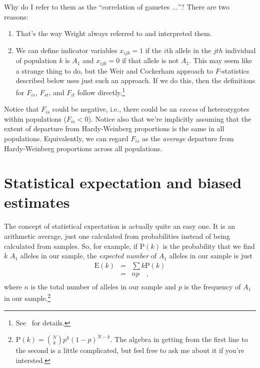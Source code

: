 Why do I refer to them as the ``correlation of gametes $\dots$''?
There are two reasons:

\begin{enumerate}

\item That's the way Wright always referred to and interpreted them.

\item We can define indicator variables $x_{ijk} = 1$ if the $i$th
  allele in the $jth$ individual of population $k$ is $A_1$ and
  $x_{ijk} = 0$ if that allele is not $A_1$. This may seem like a
  strange thing to do, but the Weir and Cockerham approach to
  $F$-statistics described below uses just such an approach. If we do
  this, then the definitions for $F_{is}$, $F_{st}$, and $F_{it}$
  follow directly.\footnote{See~\cite{Weir-1996} for details.}

\end{enumerate}

Notice that $F_{is}$ could be negative, i.e., there could be an {\it
  excess\/} of heterozygotes within populations ($F_{is} < 0$). Notice
also that we're implicitly assuming that the extent of departure from
Hardy-Weinberg proportions is the same in all
populations. Equivalently, we can regard $F_{is}$ as the {\it
  average\/} departure from Hardy-Weinberg proportions across all
populations.

\section*{Statistical expectation and biased
  estimates}

The concept of statistical expectation is actually quite an easy
one. It is an arithmetic average, just one calculated from
probabilities instead of being calculated from samples. So, for
example, if $\mbox{P}(k)$ is the probability that we find $k$ $A_1$ alleles
in our sample, the {\it expected number\/} of $A_1$ alleles in
our sample is just
\begin{eqnarray*}
\mbox{E}(k) &=& \sum k \mbox{P}(k) \\
     &=& n p \quad , \\
\end{eqnarray*}
where $n$ is the total number of alleles in our sample and $p$ is the
frequency of $A_1$ in our sample.\footnote{$\mbox{P}(k) = {N
  \choose k}p^k(1-p)^{N-k}$. The algebra in getting from the first
  line to the second is a little complicated, but feel free to ask me
  about it if you're intersted.}


